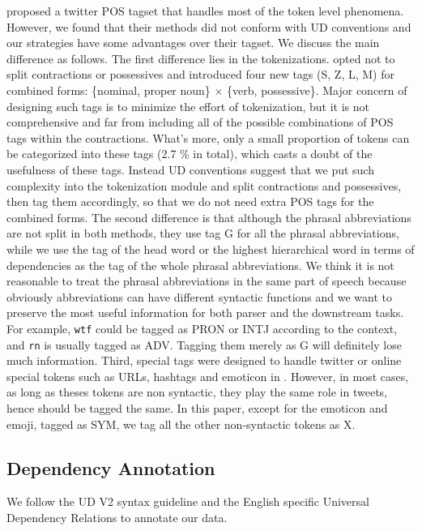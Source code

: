 \documentclass[11pt,letterpaper]{article}
\begin{document}
 proposed a twitter POS tagset that handles most of the token level phenomena. However, we found that their methods did not conform with UD conventions and our strategies have some advantages over their tagset. We discuss the main difference as follows.
The first difference lies in the tokenizations.
 opted not to split contractions or possessives and introduced four new tags (S, Z, L, M) for combined forms: \{nominal, proper noun\} $\times$ \{verb, possessive\}. 
Major concern of designing such tags is to minimize the effort of tokenization, but it is not comprehensive and far from including all of the possible combinations of POS tags within the contractions. 
What's more, only a small proportion of tokens can be categorized into these tags (2.7 \% in total), which casts a doubt of the usefulness of these tags.
Instead UD conventions suggest that we put such complexity into the tokenization module and split contractions and possessives, then tag them accordingly, so that we do not need extra POS tags for the combined forms.
The second difference is that although the phrasal abbreviations are not split in both methods, they use tag G for all the phrasal abbreviations, while we use the tag of the head word or the highest hierarchical word in terms of dependencies as the tag of the whole phrasal abbreviations. 
We think it is not reasonable to treat the phrasal abbreviations in the same part of speech because obviously abbreviations can have different syntactic functions and we want to preserve the most useful information for both parser and the downstream tasks. For example, {\tt wtf} could be tagged as PRON or INTJ according to the context, and {\tt rn} is usually tagged as ADV. Tagging them merely as G will definitely lose much information.
Third, special tags were designed to handle twitter or online special tokens such as URLs, hashtags and emoticon in . However, in most cases, as long as theses tokens are non syntactic, they play the same role in tweets, hence should be tagged the same. In this paper, except for the emoticon and emoji, tagged as SYM, we tag all the other non-syntactic tokens as X.


\subsection{Dependency Annotation}


We follow the UD V2 syntax guideline and the English specific Universal Dependency Relations to annotate our data.
\end{document}
